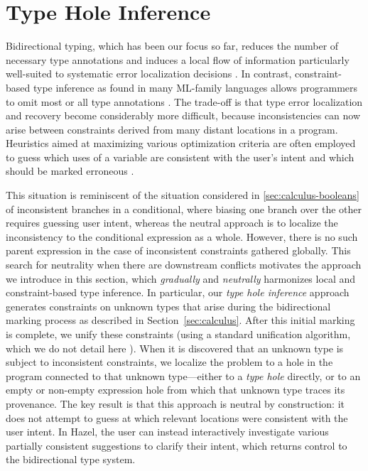 \section{Type Hole Inference}
\label{sec:thi}

Bidirectional typing, which has been our focus so far, reduces the number of necessary type annotations and induces a local flow of information particularly well-suited to systematic error localization decisions \cite{dunfield2019,pierce2000}. In contrast, 
constraint-based type inference as found in many ML-family languages allows programmers to omit most or all type annotations \cite{pierce2000}. The trade-off is that type error localization and recovery 
become considerably more difficult, because inconsistencies can now arise between 
constraints derived from many distant locations in a program. Heuristics aimed at maximizing various optimization criteria are often employed to guess which uses of a variable are consistent with the user's intent and which should be marked erroneous \cite{seidel2017,zhang2014,pavlinovic2014}.

This situation is reminiscent of the situation considered in \cref{sec:calculus-booleans} of inconsistent branches in a conditional, where biasing one branch over the other requires guessing user intent, whereas the neutral approach is to localize the inconsistency to the conditional expression as a whole. However, there is no such parent expression in the case of inconsistent constraints gathered globally.
This search for neutrality when there are downstream conflicts motivates the approach we introduce in this section, which \emph{gradually} and \emph{neutrally} harmonizes local and constraint-based type inference. In particular, our \emph{type hole inference} approach generates constraints on unknown types that arise during the bidirectional marking process as described in Section~\ref{sec:calculus}. After this initial marking is complete, we unify these constraints (using a standard unification algorithm, which we do not detail here \cite{huet1976}). When it is discovered that an unknown type is subject to inconsistent constraints, we localize the problem 
to a hole in the program connected to that unknown type---either to a \emph{type hole} directly, or to an empty or non-empty expression hole from which that unknown type traces its provenance. The key result is that this approach is neutral by construction: it does not attempt to guess at which relevant locations were consistent with the user intent. In Hazel, the user can instead interactively investigate various partially consistent suggestions to clarify their intent, which returns control to the bidirectional type system. 

